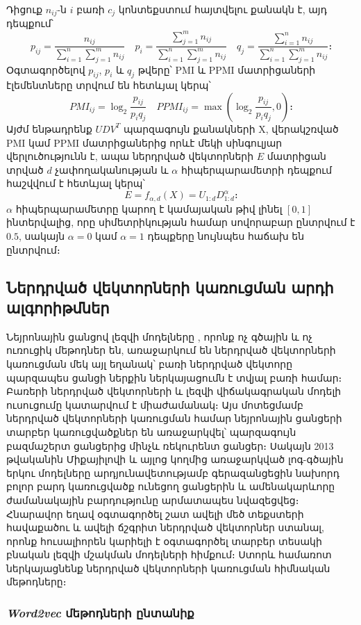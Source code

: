 \documentclass[11pt]{article}
\begin{document}
\par Դիցուք $n_{ij}$-ն $i$ բառի $c_j$ կոնտեքստում հայտվելու քանակն է, այդ դեպքում՝
$$p_{ij} = \frac{n_{ij}}{\sum_{i=1}^{n}\sum_{j=1}^{m}n_{ij}} \quad p_i = \frac{\sum_{j=1}^{m}n_{ij}}{\sum_{i=1}^{n}\sum_{j=1}^{m}n_{ij}} \quad q_j = \frac{\sum_{i=1}^{n}n_{ij}}{\sum_{i=1}^{n}\sum_{j=1}^{m}n_{ij}}։$$
Օգտագործելով  $p_{ij}$, $p_{i}$ և $q_{j}$ թվերը՝ PMI և PPMI մատրիցաների էլեմենտները տրվում են հետևյալ կերպ՝
$$PMI_{ij} = \log_2 \frac{p_{ij}}{p_iq_j} \quad PPMI_{ij} = \max \left (\log_2 \frac{p_{ij}}{p_iq_j}, 0\right)։$$
Այժմ ենթադրենք $UDV^T$ պարզագույն քանակների X, վերակշռված PMI կամ PPMI մատրիցաներից որևէ մեկի սինգուլյար վերլուծությունն է, ապա ներդրված վեկտորների $E$ մատրիցան տրված $d$ չափողականության և $\alpha$ հիպերպարամետրի դեպքում հաշվվում է հետևյալ կերպ՝
$$E = f_{\alpha, d}(X) = U_{1:d}D^{\alpha} _{1:d}։$$
$\alpha$ հիպերպարամետրը կարող է կամայական թիվ լինել $[0, 1]$ ինտերվալից, որը սիմետրիկության համար սովորաբար ընտրվում է $0.5$, սակայն $\alpha=0$ կամ $\alpha=1$ դեպքերը նույնպես հաճախ են ընտրվում։
\pagebreak

\subsection*{\hfill Ներդրված վեկտորների կառուցման արդի ալգորիթմներ \hfill} \noindent
{}
{}
\par Նեյրոնային ցանցով լեզվի մոդելները \cite{bib_item_6, bib_item_25}, որոնք ոչ գծային և ոչ ուռուցիկ մեթոդներ են, առաջարկում են ներդրված վեկտորների կառուցման մեկ այլ եղանակ՝ բառի ներդրված վեկտորը պարզապես ցանցի ներքին ներկայացումն է տվյալ բառի համար։ Բառերի ներդրված վեկտորների և  լեզվի վիճակագրական մոդելի ուսուցումը կատարվում է միաժամանակ։ Այս մոտեցմամբ ներդրված վեկտորների կառուցման համար նեյրոնային ցանցերի տարբեր կառուցվածքներ են առաջարկվել՝  պարզագույն բազմաշերտ ցանցերից մինչև ռեկուրենտ ցանցեր։ Սակայն 2013 թվականին Միքայիլովի և այլոց կողմից \cite{bib_item_26} առաջարկված լոգ-գծային երկու մոդելները արդյունավետությամբ գերազանցեցին նախորդ բոլոր  բարդ կառուցվածք ունեցող ցանցերին և ամենակարևորը ժամանակային բարդությունը արմատապես նվազեցվեց։ Հնարավոր եղավ օգտագործել շատ ավելի մեծ տեքստերի հավաքածու և ավելի ճշգրիտ ներդրված վեկտորներ ստանալ, որոնք հուսալիորեն կարիելի է օգտագործել տարբեր տեսակի բնական լեզվի մշակման մոդելների հիմքում։ Ստորև համառոտ ներկայացնենք ներդրված վեկտորների կառուցման հիմնական մեթոդները։

\subsubsection*{\hfill \textit{Word2vec} մեթոդների ընտանիք \hfill} \noindent
{}
{}
\end{document}

